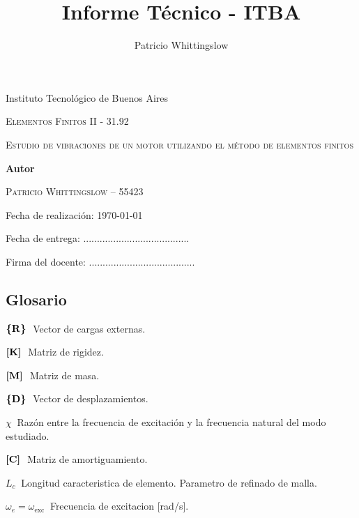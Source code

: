 \documentclass[onecolumn,10pt,titlepage,a4paper]{article}
\title{Informe Técnico - ITBA}
\author{Patricio Whittingslow}
\newcommand{\glossentry}[2]{$#1\ $ \indent #2 \par \vspace{.4cm} }
\begin{document}
\begin{titlepage}
	\centering
	
	{ \large Instituto Tecnológico de Buenos Aires  \par }
	\vspace{2cm}
	{\Large \scshape Elementos Finitos II - 31.92 \par}
	\vspace{2cm}
	{\Huge \scshape Estudio de vibraciones de un motor utilizando el método de elementos finitos\par }
	\vspace{.5cm}
	{\Large  \par}
	\vspace{2cm}
	{\large \bf Autor \par}
	\vspace{.5cm}
	\textsc{\large Patricio Whittingslow -- 55423}
	\vspace{2cm}
	{\par \large Fecha de realización: \today \par}
	\vspace{1cm}
	{\large Fecha de entrega: .......................................\par}
	\vspace{\fill}
	{\large Firma del docente: .......................................}
	\vspace{\fill}
\end{titlepage}




\begin{multicols}{2}
	\section*{Glosario}
	\glossentry{\Cme{R}}{Vector de cargas externas.}
	\glossentry{\Mme{K}}{Matriz de rigidez.}
	\glossentry{\Mme{M}}{Matriz de masa.}
	\glossentry{\Cme{D}}{Vector de desplazamientos.}
	\glossentry{\chi}{Razón entre la frecuencia de excitación y la frecuencia natural del modo estudiado.}
	\glossentry{\Mme{C}}{Matriz de amortiguamiento.}
	\glossentry{L_c}{Longitud caracteristica de elemento. Parametro de refinado de malla.}
	\glossentry{\omega_e=\omega_{\mathrm{exc}}}{Frecuencia de excitacion [rad/s].}
\end{multicols}

\setcounter{section}{-1}
\end{document}
